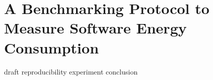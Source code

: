 \newpage
\chapter{A Benchmarking Protocol to Measure Software Energy Consumption}\label{chapter:benchmarking}

{draft}
{reproducibility}
{experiment}
{conclusion}

